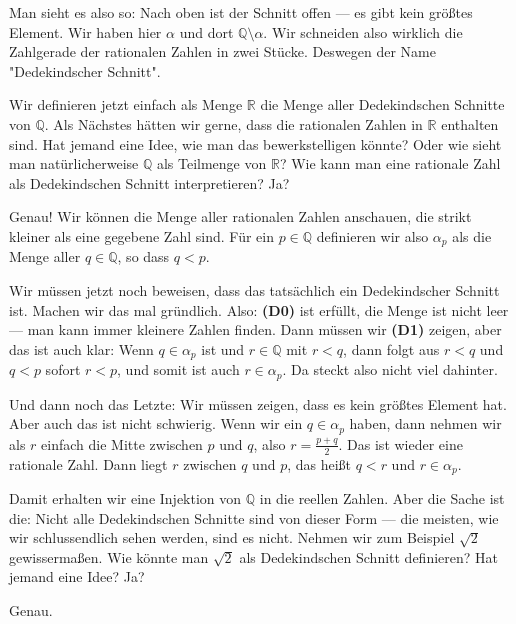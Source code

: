 \begin{spoken-clean}[00:27:12 - 00:29:18]
Man sieht es also so: Nach oben ist der Schnitt offen --- es gibt kein größtes Element. Wir haben hier $\alpha$ und dort $\mathbb{Q} \setminus \alpha$. Wir schneiden also wirklich die Zahlgerade der rationalen Zahlen in zwei Stücke. Deswegen der Name "Dedekindscher Schnitt".

Wir definieren jetzt einfach als Menge $\mathbb{R}$ die Menge aller Dedekindschen Schnitte von $\mathbb{Q}$. Als Nächstes hätten wir gerne, dass die rationalen Zahlen in $\mathbb{R}$ enthalten sind. Hat jemand eine Idee, wie man das bewerkstelligen könnte? Oder wie sieht man natürlicherweise $\mathbb{Q}$ als Teilmenge von $\mathbb{R}$? Wie kann man eine rationale Zahl als Dedekindschen Schnitt interpretieren? Ja?


Genau! Wir können die Menge aller rationalen Zahlen anschauen, die strikt kleiner als eine gegebene Zahl sind. Für ein $p \in \mathbb{Q}$ definieren wir also $\alpha_p$ als die Menge aller $q \in \mathbb{Q}$, so dass $q < p$.
\end{spoken-clean}

\begin{spoken-clean}[00:29:18 - 00:30:51]
Wir müssen jetzt noch beweisen, dass das tatsächlich ein Dedekindscher Schnitt ist. Machen wir das mal gründlich. Also: \textbf{(D0)} ist erfüllt, die Menge ist nicht leer --- man kann immer kleinere Zahlen finden. Dann müssen wir \textbf{(D1)} zeigen, aber das ist auch klar: Wenn $q \in \alpha_p$ ist und $r \in \mathbb{Q}$ mit $r < q$, dann folgt aus $r < q$ und $q < p$ sofort $r < p$, und somit ist auch $r \in \alpha_p$. Da steckt also nicht viel dahinter.

Und dann noch das Letzte: Wir müssen zeigen, dass es kein größtes Element hat. Aber auch das ist nicht schwierig. Wenn wir ein $q \in \alpha_p$ haben, dann nehmen wir als $r$ einfach die Mitte zwischen $p$ und $q$, also $r = \frac{p+q}{2}$. Das ist wieder eine rationale Zahl. Dann liegt $r$ zwischen $q$ und $p$, das heißt $q < r$ und $r \in \alpha_p$.

Damit erhalten wir eine Injektion von $\mathbb{Q}$ in die reellen Zahlen. Aber die Sache ist die: Nicht alle Dedekindschen Schnitte sind von dieser Form --- die meisten, wie wir schlussendlich sehen werden, sind es nicht. Nehmen wir zum Beispiel $\sqrt{2}$ gewissermaßen. Wie könnte man $\sqrt{2}$ als Dedekindschen Schnitt definieren? Hat jemand eine Idee? Ja?


Genau.
\end{spoken-clean}

